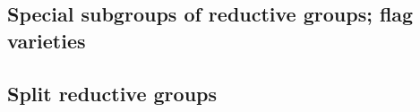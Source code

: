         \subsection{Special subgroups of reductive groups; flag varieties}
        
        \subsection{Split reductive groups}